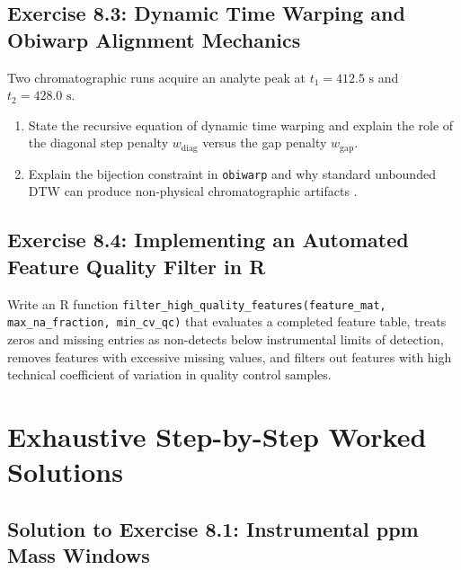 \documentclass[11pt,twoside,openright]{book}
\begin{document}
\subsection*{Exercise 8.3: Dynamic Time Warping and Obiwarp Alignment Mechanics}
Two chromatographic runs acquire an analyte peak at $t_1 = 412.5\text{ s}$ and $t_2 = 428.0\text{ s}$.
\begin{enumerate}
    \item State the recursive equation of dynamic time warping and explain the role of the diagonal step penalty $w_{\text{diag}}$ versus the gap penalty $w_{\text{gap}}$.
    \item Explain the bijection constraint in \texttt{obiwarp} and why standard unbounded DTW can produce non-physical chromatographic artifacts \cite{prince2006chromatographic}.
\end{enumerate}

\subsection*{Exercise 8.4: Implementing an Automated Feature Quality Filter in R}
Write an R function \texttt{filter\_high\_quality\_features(feature\_mat, max\_na\_fraction, min\_cv\_qc)} that evaluates a completed feature table, treats zeros and missing entries as non-detects below instrumental limits of detection, removes features with excessive missing values, and filters out features with high technical coefficient of variation in quality control samples.

\section{Exhaustive Step-by-Step Worked Solutions}

\subsection*{Solution to Exercise 8.1: Instrumental ppm Mass Windows}
\end{document}

